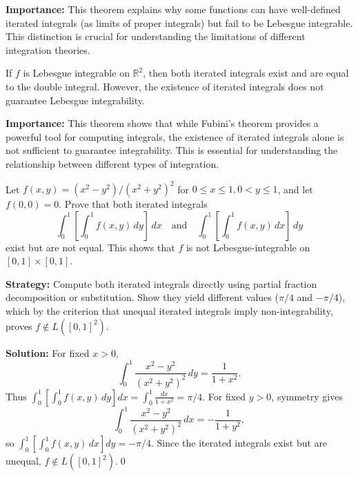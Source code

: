 \noindent\textbf{Importance:} This theorem explains why some functions can have well-defined iterated integrals (as limits of proper integrals) but fail to be Lebesgue integrable. This distinction is crucial for understanding the limitations of different integration theories.



\begin{theorem}
If $f$ is Lebesgue integrable on $\mathbb{R}^2$, then both iterated integrals exist and are equal to the double integral. However, the existence of iterated integrals does not guarantee Lebesgue integrability.
\end{theorem}

\noindent\textbf{Importance:} This theorem shows that while Fubini's theorem provides a powerful tool for computing integrals, the existence of iterated integrals alone is not sufficient to guarantee integrability. This is essential for understanding the relationship between different types of integration.





\begin{problembox}
\begin{problemstatement}
Let \( f(x, y) = (x^2 - y^2)/(x^2 + y^2)^2 \) for \( 0 \leq x \leq 1, 0 < y \leq 1 \), and let \( f(0, 0) = 0 \). Prove that both iterated integrals
\[
\int_0^1 \left[ \int_0^1 f(x, y) \, dy \right] \, dx \quad \text{and} \quad \int_0^1 \left[ \int_0^1 f(x, y) \, dx \right] \, dy
\]
exist but are not equal. This shows that \( f \) is not Lebesgue-integrable on \([0, 1] \times [0, 1]\).
\end{problemstatement}
\end{problembox}

\noindent\textbf{Strategy:} Compute both iterated integrals directly using partial fraction decomposition or substitution. Show they yield different values (\(\pi/4\) and \(-\pi/4\)), which by the criterion that unequal iterated integrals imply non-integrability, proves \(f \notin L([0,1]^2)\).

\bigskip\noindent\textbf{Solution:}
For fixed \(x>0\),
\[
\int_0^1 \frac{x^2-y^2}{(x^2+y^2)^2}\,dy = \frac{1}{1+x^2}.
\]
Thus \(\int_0^1[\int_0^1 f(x,y)\,dy]dx=\int_0^1\!\frac{dx}{1+x^2}=\pi/4\). For fixed \(y>0\), symmetry gives
\[
\int_0^1 \frac{x^2-y^2}{(x^2+y^2)^2}\,dx = -\frac{1}{1+y^2},
\]
so \(\int_0^1[\int_0^1 f(x,y)\,dx]dy=-\pi/4\). Since the iterated integrals exist but are unequal, \(f\notin L([0,1]^2)\).\qed



